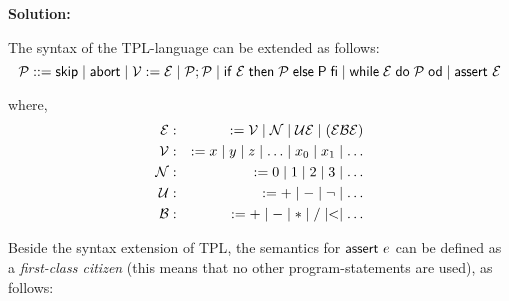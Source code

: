 \newcommand\Ext[2]{\infer[]{#1}{#2}}
\newcommand\PC[2]{\infer[\text{\tiny(pc)}]{#1}{#2}}
\newcommand\TC[2]{\infer[\text{\tiny(tc)}]{#1}{#2}}

\textbf{Solution:}\newline

The syntax of the TPL-language can be extended as follows:%
\begin{equation*}
\mathcal{P}::=\mathsf{skip}\mid \mathsf{abort}\mid \mathcal{V}:=\mathcal{E}%
\mid \mathcal{P};\mathcal{P}\mid \mathsf{if}\;\mathcal{E}\;\mathsf{then}\;%
\mathcal{P}\;\mathsf{else}\;\mathsf{P}\;\mathsf{fi}\mid \mathsf{while}\;%
\mathcal{E}\;\mathsf{do}\;\mathcal{P}\;\mathsf{od}\mid \kw{assert}\ \mathcal{%
E}
\end{equation*}

where,%
\begin{eqnarray*}
\mathcal{E} &:&:=\mathcal{V}\mid \mathcal{N}\mid \mathcal{UE}\mid (\mathcal{%
EBE}) \\
\mathcal{V} &:&:=x\mid y\mid z\mid \ldots \mid x_{0}\mid x_{1}\mid \ldots \\
\mathcal{N} &:&:=0\mid 1\mid 2\mid 3\mid \ldots \\
\mathcal{U} &:&:=+\mid -\mid \lnot \mid \ldots \\
\mathcal{B} &:&:=+\mid -\mid \ast \mid /\mid <\mid \ldots
\end{eqnarray*}

Beside the syntax extension of \textrm{TPL}, the semantics for $\mbox{\sffamily assert}\
e$ can be defined as a \textsl{first-class citizen} (this means that no
other program-statements are used), as follows:

